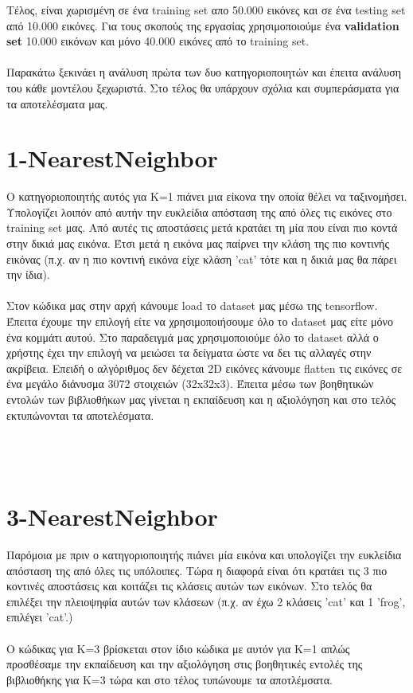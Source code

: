 \documentclass[11pt, letterpaper]{article}
\begin{document}
Τέλος, είναι χωρισμένη σε ένα training set απο 50.000 εικόνες και σε ένα testing set από 10.000 εικόνες. Για τους σκοπούς της εργασίας χρησιμοποιούμε
ένα \textbf{validation set} 10.000 εικόνων και μόνο 40.000 εικόνες από το training set. \\  \\
Παρακάτω ξεκινάει η ανάλυση πρώτα των δυο κατηγοριοποιητών και έπειτα ανάλυση του κάθε μοντέλου ξεχωριστά. Στο τέλος θα υπάρχουν σχόλια και συμπεράσματα 
για τα αποτελέσματα μας.

\newpage

\section*{1-NearestNeighbor}
Ο κατηγοριοποιητής αυτός για Κ=1 πιάνει μια είκονα την οποία θέλει να ταξινομήσει. Υπολογίζει λοιπόν από αυτήν την ευκλείδια απόσταση
της από όλες τις εικόνες στο training set μας. Από αυτές τις αποστάσεις μετά κρατάει τη μία που είναι πιο κοντά στην δικιά μας εικόνα. 
Έτσι μετά η εικόνα μας παίρνει την κλάση της πιο κοντινής εικόνας (π.χ. αν η πιο κοντινή εικόνα είχε κλάση 'cat' τότε και η δικιά μας θα πάρει την ίδια).\\ \\
Στον κώδικα μας στην αρχή κάνουμε load το dataset μας μέσω της tensorflow. Έπειτα έχουμε την επιλογή είτε να χρησιμοποιήσουμε όλο το dataset μας 
είτε μόνο ένα κομμάτι αυτού. Στο παραδειγμά μας χρησιμοποιούμε όλο το dataset αλλά ο χρήστης έχει την επιλογή να μειώσει τα δείγματα ώστε να δει τις αλλαγές
στην ακρίβεια. Επειδή ο αλγόριθμος δεν δέχεται 2D εικόνες κάνουμε flatten τις εικόνες σε ένα μεγάλο διάνυσμα 3072 στοιχειών (32x32x3).
Έπειτα μέσω των βοηθητικών εντολών των βιβλιοθήκων μας γίνεται η εκπαίδευση και η αξιολόγηση και στο τελός εκτυπώνονται τα αποτελέσματα. \\ \\ \\ \\


\section*{3-NearestNeighbor}
Παρόμοια με πριν ο κατηγοριοποιητής πιάνει μία εικόνα και υπολογίζει την ευκλείδια απόσταση της από όλες τις υπόλοιπες. Τώρα η διαφορά είναι
ότι κρατάει τις 3 πιο κοντινές αποστάσεις και κοιτάζει τις κλάσεις αυτών των εικόνων. Στο τελός θα επιλέξει την πλειοψηφία αυτών των κλάσεων (π.χ. αν έχω 2 κλάσεις 'cat' 
και 1 'frog', επιλέγει 'cat'.) \\ \\
Ο κώδικας για Κ=3 βρίσκεται στον ίδιο κώδικα με αυτόν για Κ=1  απλώς προσθέσαμε την εκπαίδευση και την αξιολόγηση στις βοηθητικές εντολές της βιβλιοθήκης
για Κ=3 τώρα και στο τέλος τυπώνουμε τα αποτλέμσατα. \\ \\ \\ \\ 
\end{document}
